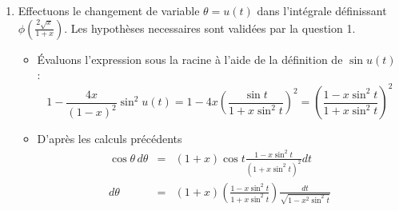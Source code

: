 \begin{enumerate}
\begin{enumerate}
Par d\'{e}finition, $u(t)\in \left[ 0,\frac{\pi }{2}\right] $ donc $\cos u(t)>0$. L'\'{e}quation (1) montre alors que $u^{\prime }(t)>0$ lorsque $t\in \left[ 0,\frac{\pi }{2}\right[ $. On en d\'{e}duit qu'elle est strictement croissante dans $\left[ 0,\frac{\pi }{2}\right]$. Comme de plus $u(0)=0$ et $u(\frac{\pi }{2})=\frac{\pi }{2}$. C'est une bijection continue de $\left[ 0,\frac{\pi }{2}\right] $ dans $\left[ 0,\frac{\pi }{2}\right]$.

La bijection r\'{e}ciproque d'une bijection continue sur un intervalle est continue. La formule (1) montre que $u^{\prime }(t)$ ne s'annule pas dans $\left[ 0,\frac{\pi }{2}\right[ $ et 
\begin{displaymath}
 u^{\prime }(\frac{\pi }{2})=\sqrt{\frac{1-x}{1+x}}\neq 0
\end{displaymath}
La bijection r\'{e}ciproque de $u$ est donc d\'{e}rivable dans $\left[ 0,\frac{\pi }{2}\right] $. L'expression 
\begin{displaymath}
(u^{-1})'=\frac{1}{u^{\prime }\circ u^{-1}} 
\end{displaymath}
de la d\'{e}riv\'{e}e montre sa continuit\'{e}.

\item Comme $\arcsin$ est à valeurs entre $-\frac{\pi}{2}$ et $\frac{\pi}{2}$, son $\cos$ est positif. On peut écrire 
\begin{multline*}
\cos u(t) = \sqrt{1-\sin^2(t)} 
= \frac{\sqrt{(1+x\sin^2t)^2-(1+x)^2\sin^2t}}{1+x\sin^2t}\\
= \frac{\sqrt{1-(1+x^2)\sin^2t + x^2\sin^4t}}{1+x\sin^2t}
= \frac{\sqrt{\cos^2t - x^2\sin^2t\cos^2t}}{1+x\sin^2t}\\
= \frac{\cos t}{1+x\sin t}\sqrt{1-x^{2}\sin^{2}t}
\end{multline*}
\end{enumerate}

\item  
Effectuons le changement de variable $\theta =u(t)$ dans l'int\'{e}grale d\'{e}finissant $\phi (\frac{2\sqrt{x}}{1+x})$. Les hypothèses necessaires sont validées par la question 1.

\begin{itemize}
\item  \'Evaluons l'expression sous la racine \`{a} l'aide de la d\'{e}finition de $\sin u(t)$ :
\[
1-\frac{4x}{(1-x)^{2}}\sin ^{2}u(t)=1-4x\left( \frac{\sin t}{1+x\sin ^{2}t}\right) ^{2}=\left( \frac{1-x\sin ^{2}t}{1+x\sin ^{2}t}\right) ^{2}
\]

\item  D'apr\`{e}s les calculs pr\'{e}c\'{e}dents 
\begin{eqnarray*}
\cos \theta \,d\theta  &=&(1+x)\cos t\frac{1-x\sin ^{2}t}{(1+x\sin ^{2}t)^{2}}dt \\
d\theta  &=&(1+x)\left( \frac{1-x\sin ^{2}t}{1+x\sin ^{2}t}\right) \frac{dt}{\sqrt{1-x^{2}\sin ^{2}t}}
\end{eqnarray*}


\end{itemize}
\end{enumerate}
